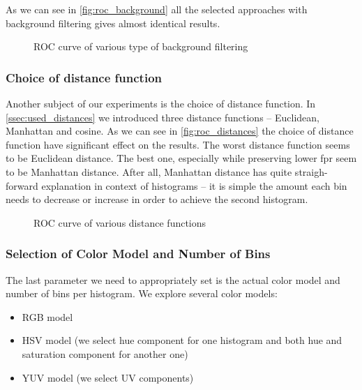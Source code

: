 As we can see in \autoref{fig:roc_background} all the selected approaches
with background filtering gives almost identical results.

\begin{figure}[tb]
    \centering
    \def\svgwidth{\columnwidth}
    
    \caption{ROC curve of various type of background filtering}
    \label{fig:roc_background}
\end{figure}

\subsubsection{Choice of distance function}

Another subject of our experiments is the choice of distance function. In
\autoref{ssec:used_distances} we introduced three distance functions --
Euclidean, Manhattan and cosine. As we can see in \autoref{fig:roc_distances}
the choice of distance function have significant effect on the results.
The worst distance function seems to be Euclidean distance. The best one,
especially while preserving lower \gls{fpr} seem to be Manhattan distance.
After all, Manhattan distance has quite straigh-forward explanation in context
of histograms -- it is simple the amount each bin needs to decrease or increase
in order to achieve the second histogram.

\begin{figure}[tb]
    \centering
    \def\svgwidth{\columnwidth}
    
    \caption{ROC curve of various distance functions}
    \label{fig:roc_distances}
\end{figure}

\subsubsection{Selection of Color Model and Number of Bins}

The last parameter we need to appropriately set is the actual color model
and number of bins per histogram. We explore several color models:

\begin{itemize}
    \item RGB model
    \item HSV model (we select hue component for one histogram and both hue and saturation component for another one)
    \item YUV model (we select UV components)
\end{itemize}


